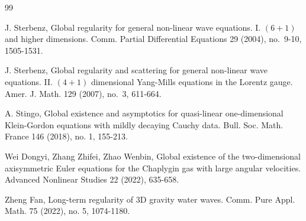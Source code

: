 \documentclass[11pt,twoside]{article}
\theoremstyle{plain}
\theoremstyle{definition}
\theoremstyle{assumption}
\numberwithin{equation}{section}
\begin{document}
\begin{thebibliography}{99}
		
		
		 J. Sterbenz, Global regularity for general non-linear wave equations. I. $(6+1)$ and higher dimensions.
 Comm. Partial Differential Equations 29 (2004), no.~9-10, 1505-1531.
		
		 J. Sterbenz, Global regularity and scattering for general non-linear wave equations. II. $(4+1)$ dimensional Yang-Mills equations in the Lorentz gauge. Amer. J. Math.  129 (2007), no.~3, 611-664.
		
		
		
 A. Stingo, Global existence and asymptotics for quasi-linear one-dimensional Klein-Gordon equations with mildly decaying Cauchy data. Bull. Soc. Math. France 146 (2018), no. 1, 155-213.


		
    Wei Dongyi, Zhang Zhifei, Zhao Wenbin, Global existence of the two-dimensional axisymmetric
Euler equations for the Chaplygin gas with large angular velocities. Advanced
Nonlinear Studies 22 (2022), 635-658.


  Zheng Fan, Long-term regularity of 3D gravity water waves. Comm. Pure Appl. Math. 75 (2022), no. 5, 1074-1180.


	\end{thebibliography}
	
\end{document}
